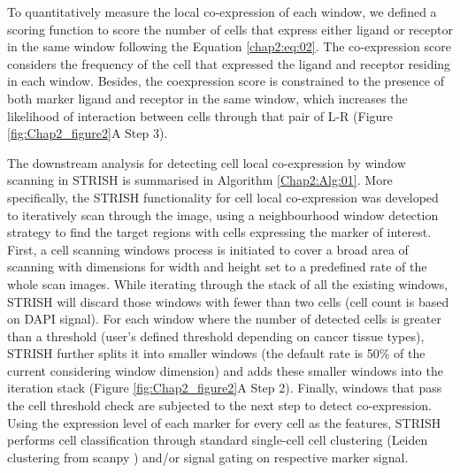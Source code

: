 To quantitatively measure the local co-expression of each window, we defined a scoring function to score the number of cells that express either ligand or receptor in the same window following the Equation \ref{chap2:eq:02}. The co-expression score considers the frequency of the cell that expressed the ligand and receptor residing in each window. Besides, the coexpression score is constrained to the presence of both marker ligand and receptor in the same window, which increases the likelihood of interaction between cells through that pair of L-R (Figure \ref{fig:Chap2_figure2}A Step 3). 
   
The downstream analysis for detecting cell local co-expression by window scanning in STRISH is summarised in Algorithm \ref{Chap2:Alg:01}. More specifically, the STRISH functionality for cell local co-expression was developed to iteratively scan through the image, using a neighbourhood window detection strategy to find the target regions with cells expressing the marker of interest. First, a cell scanning windows process is initiated to cover a broad area of scanning with dimensions for width and height set to a predefined rate of the whole scan images. While iterating through the stack of all the existing windows, STRISH will discard those windows with fewer than two cells (cell count is based on DAPI signal). For each window where the number of detected cells is greater than a threshold (user’s defined threshold depending on cancer tissue types), STRISH further splits it into smaller windows (the default rate is 50\% of the current considering window dimension) and adds these smaller windows into the iteration stack (Figure \ref{fig:Chap2_figure2}A Step 2). Finally, windows that pass the cell threshold check are subjected to the next step to detect co-expression. Using the expression level of each marker for every cell as the features, STRISH performs cell classification through standard single-cell cell clustering (\ie Leiden clustering from scanpy \cite{wolf2018scanpy}) and/or signal gating on respective marker signal.

